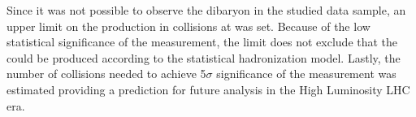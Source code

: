 Since it was not possible to observe the \dst dibaryon in the studied data sample, an upper limit
on the \dst production in \pPb collisions at \sctev was set. Because of the low statistical 
significance of the measurement, the limit does not exclude that the \dst could be produced 
according to the statistical hadronization model.
Lastly, the number of \pPb collisions needed to achieve 5$\sigma$ significance of the measurement 
was estimated providing a prediction for future analysis in the High Luminosity LHC era.
